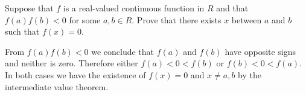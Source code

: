
Suppose that $f$ is a real-valued continuous function in $R$ and that
$f(a)f(b)<0$ for some $a,b\in R$.
Prove that there exists $x$ between $a$ and $b$ such that $f(x)=0$.

\medskip

From $f(a)f(b)<0$ we conclude that
$f(a)$ and $f(b)$ have opposite signs and neither is zero.
Therefore either $f(a)<0<f(b)$ or $f(b)<0<f(a)$.
In both cases we have the existence of $f(x)=0$ and $x\ne a,b$ by
the intermediate value theorem.

